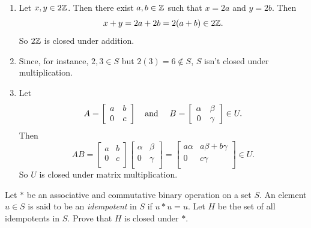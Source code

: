 \begin{solution}[print=false]
\begin{enumerate}
\item Let $x, y\in 2\mathbb{Z}$. Then there exist $a,b\in \mathbb{Z}$ such that $x=2a$ and $y=2b$.  Then $$x+y=2a+2b=2(a+b)\in 2\mathbb{Z}.$$ So $2\mathbb{Z}$ is closed under addition.
\item Since, for instance, $2,3\in S$ but $2(3)=6\not\in S$, $S$ isn't closed under multiplication.
\item Let $$A=\left[
          \begin{array}{cc}
            a & b \\
            0 & c \\
          \end{array}
        \right] \mbox{\quad and \quad}B=\left[
          \begin{array}{cc}
            \alpha & \beta \\
            0 & \gamma \\
          \end{array}
        \right]\in U.$$ Then $$AB=\left[
          \begin{array}{cc}
            a & b \\
            0 & c \\
          \end{array}
        \right]\left[
          \begin{array}{cc}
            \alpha & \beta \\
            0 & \gamma \\
          \end{array}
        \right]=\left[
          \begin{array}{cc}
            a\alpha & a\beta+b\gamma \\
            0 & c\gamma \\
          \end{array}
        \right]\in U.$$ So $U$ is closed under matrix multiplication.

\end{enumerate}
\end{solution}

\begin{exercise}[ID=2H]
 Let $*$ be an associative and commutative binary operation on a set $S$. An element $u\in S$ is said to be an \textit{idempotent} in $S$ if $u*u=u$. Let $H$ be the set of all idempotents in $S$.  Prove that $H$ is closed under $*$.
\end{exercise}

